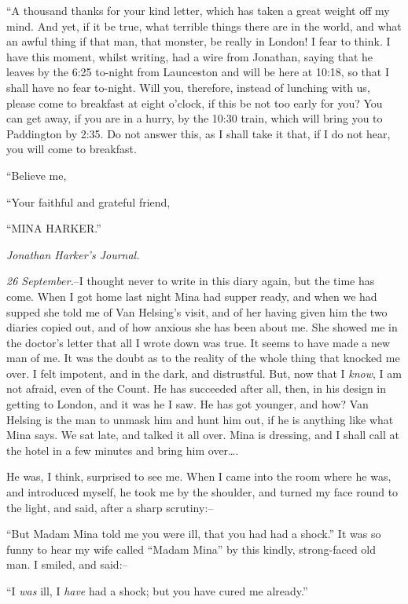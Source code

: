 \documentclass[12pt,openright]{book}
\begin{document}
“A thousand thanks for your kind letter, which has taken a great weight off my mind. And yet, if it be true, what terrible things there are in the world, and what an awful thing if that man, that monster, be really in London! I fear to think. I have this moment, whilst writing, had a wire from Jonathan, saying that he leaves by the 6:25 to-night from Launceston and will be here at 10:18, so that I shall have no fear to-night. Will you, therefore, instead of lunching with us, please come to breakfast at eight o’clock, if this be not too early for you? You can get away, if you are in a hurry, by the 10:30 train, which will bring you to Paddington by 2:35. Do not answer this, as I shall take it that, if I do not hear, you will come to breakfast.

“Believe me,

“Your faithful and grateful friend,

“MINA HARKER.”

\textit{Jonathan Harker’s Journal.}

\textit{26 September.}–I thought never to write in this diary again, but the time has come. When I got home last night Mina had supper ready, and when we had supped she told me of Van Helsing’s visit, and of her having given him the two diaries copied out, and of how anxious she has been about me. She showed me in the doctor’s letter that all I wrote down was true. It seems to have made a new man of me. It was the doubt as to the reality of the whole thing that knocked me over. I felt impotent, and in the dark, and distrustful. But, now that I \textit{know}, I am not afraid, even of the Count. He has succeeded after all, then, in his design in getting to London, and it was he I saw. He has got younger, and how? Van Helsing is the man to unmask him and hunt him out, if he is anything like what Mina says. We sat late, and talked it all over. Mina is dressing, and I shall call at the hotel in a few minutes and bring him over….

He was, I think, surprised to see me. When I came into the room where he was, and introduced myself, he took me by the shoulder, and turned my face round to the light, and said, after a sharp scrutiny:–

“But Madam Mina told me you were ill, that you had had a shock.” It was so funny to hear my wife called “Madam Mina” by this kindly, strong-faced old man. I smiled, and said:–

“I \textit{was} ill, I \textit{have} had a shock; but you have cured me already.”
\end{document}

